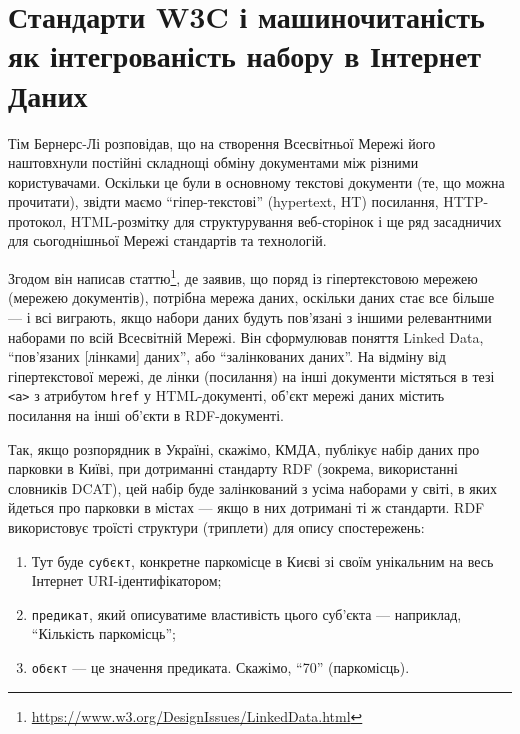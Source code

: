 \documentclass[
]{agujournal2019}
\providecommand{\tightlist}{%
  \setlength{\itemsep}{0pt}\setlength{\parskip}{0pt}}\usepackage{longtable,booktabs,array}
\begin{document}
\section{\texorpdfstring{\textbf{Стандарти W3C і машиночитаність як
інтегрованість набору в Інтернет
Даних}}{Стандарти W3C і машиночитаність як інтегрованість набору в Інтернет Даних}}\label{ux441ux442ux430ux43dux434ux430ux440ux442ux438-w3c-ux456-ux43cux430ux448ux438ux43dux43eux447ux438ux442ux430ux43dux456ux441ux442ux44c-ux44fux43a-ux456ux43dux442ux435ux433ux440ux43eux432ux430ux43dux456ux441ux442ux44c-ux43dux430ux431ux43eux440ux443-ux432-ux456ux43dux442ux435ux440ux43dux435ux442-ux434ux430ux43dux438ux445}

Тім Бернерс-Лі розповідав, що на створення Всесвітньої Мережі його
наштовхнули постійні складнощі обміну документами між різними
користувачами. Оскільки це були в основному текстові документи (те, що
можна прочитати), звідти маємо ``гіпер-текстові'' (hypertext, HT)
посилання, HTTP-протокол, HTML-розмітку для структурування веб-сторінок
і ще ряд засадничих для сьогоднішньої Мережі стандартів та технологій.

Згодом він написав статтю\footnote{\url{https://www.w3.org/DesignIssues/LinkedData.html}},
де заявив, що поряд із гіпертекстовою мережею (мережею документів),
потрібна мережа даних, оскільки даних стає все більше --- і всі
виграють, якщо набори даних будуть пов'язані з іншими релевантними
наборами по всій Всесвітній Мережі. Він сформулював поняття Linked Data,
``пов'язаних {[}лінками{]} даних'', або ``залінкованих даних''. На
відміну від гіпертекстової мережі, де лінки (посилання) на інші
документи містяться в тезі \texttt{\textless{}a\textgreater{}} з
атрибутом \texttt{href} у HTML-документі, об'єкт мережі даних містить
посилання на інші об'єкти в RDF-документі.

Так, якщо розпорядник в Україні, скажімо, КМДА, публікує набір даних про
парковки в Київі, при дотриманні стандарту RDF (зокрема, використанні
словників DCAT), цей набір буде залінкований з усіма наборами у світі, в
яких йдеться про парковки в містах --- якщо в них дотримані ті ж
стандарти. RDF використовує троїсті структури (триплети) для опису
спостережень:

\begin{enumerate}
\def\labelenumi{\arabic{enumi}.}
\tightlist
\item
  Тут буде \texttt{суб\textquotesingle{}єкт}, конкретне паркомісце в
  Києві зі своїм унікальним на весь Інтернет URI-ідентифікатором;
\item
  \texttt{предикат}, який описуватиме властивість цього суб'єкта ---
  наприклад, ``Кількість паркомісць'';
\item
  \texttt{об\textquotesingle{}єкт} --- це значення предиката. Скажімо,
  ``70'' (паркомісць).
\end{enumerate}
\end{document}
